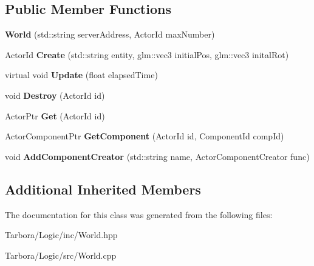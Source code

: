 \subsection*{Public Member Functions}
\begin{DoxyCompactItemize}
\item 
\mbox{\label{classTarbora_1_1World_a8917dcf7afdf801269ab5c23f17f0799}} 
{\bfseries World} (std\+::string server\+Address, Actor\+Id max\+Number)
\item 
\mbox{\label{classTarbora_1_1World_a47afd8c733a4d30acb7740ed6973fea7}} 
Actor\+Id {\bfseries Create} (std\+::string entity, glm\+::vec3 initial\+Pos, glm\+::vec3 inital\+Rot)
\item 
\mbox{\label{classTarbora_1_1World_a53c07623e7e5bc394c222e91ed7a9d76}} 
virtual void {\bfseries Update} (float elapsed\+Time)
\item 
\mbox{\label{classTarbora_1_1World_a35343723f3701595dc0e3afa68afe497}} 
void {\bfseries Destroy} (Actor\+Id id)
\item 
\mbox{\label{classTarbora_1_1World_a640842c503e93b75094c3b52f04b479e}} 
Actor\+Ptr {\bfseries Get} (Actor\+Id id)
\item 
\mbox{\label{classTarbora_1_1World_a0c8419bd81384d4ca1d11b972daa6d88}} 
Actor\+Component\+Ptr {\bfseries Get\+Component} (Actor\+Id id, Component\+Id comp\+Id)
\item 
\mbox{\label{classTarbora_1_1World_a122424c8577455836f96540d994960f2}} 
void {\bfseries Add\+Component\+Creator} (std\+::string name, Actor\+Component\+Creator func)
\end{DoxyCompactItemize}
\subsection*{Additional Inherited Members}


The documentation for this class was generated from the following files\+:\begin{DoxyCompactItemize}
\item 
Tarbora/\+Logic/inc/World.\+hpp\item 
Tarbora/\+Logic/src/World.\+cpp\end{DoxyCompactItemize}
